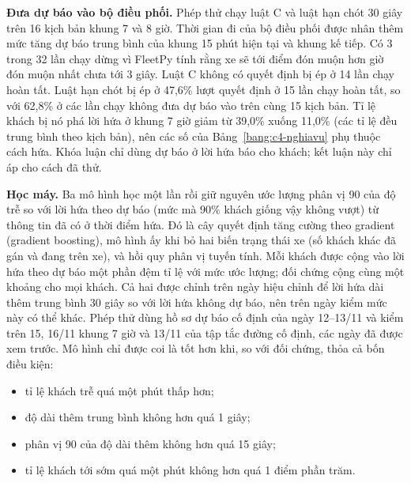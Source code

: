\textbf{Đưa dự báo vào bộ điều phối.} Phép thử chạy luật C và luật hạn chót 30 giây trên 16 kịch bản khung 7 và 8 giờ.
Thời gian đi của bộ điều phối được nhân thêm mức tăng dự báo trung bình của khung 15 phút hiện tại và khung kế tiếp. Có
3 trong 32 lần chạy dừng vì FleetPy tính rằng xe sẽ tới điểm đón muộn hơn giờ đón muộn nhất chưa tới 3 giây. Luật C
không có quyết định bị ép ở 14 lần chạy hoàn tất. Luật hạn chót bị ép ở 47,6\% lượt quyết định ở 15 lần chạy hoàn tất,
so với 62,8\% ở các lần chạy không đưa dự báo vào trên cùng 15 kịch bản. Tỉ lệ khách bị nó phá lời hứa ở khung 7 giờ giảm từ 39,0\% xuống 11,0\% (các
tỉ lệ đều trung bình theo kịch bản), nên các số của Bảng~\ref{bang:c4-nghiavu} phụ thuộc cách hứa. Khóa luận chỉ dùng
dự báo ở lời hứa báo cho khách; kết luận này chỉ áp cho cách đã thử.

\textbf{Học máy.} Ba mô hình học một lần rồi giữ nguyên ước lượng phân vị 90 của độ trễ so với lời hứa theo dự báo (mức
mà 90\% khách giống vậy không vượt) từ thông tin đã có ở thời điểm hứa. Đó là cây quyết định tăng cường theo gradient
(gradient boosting), mô hình ấy khi bỏ hai biến trạng thái xe (số khách khác đã gán và đang trên xe), và hồi quy phân vị
tuyến tính. Mỗi khách được cộng vào lời hứa theo dự báo một phần đệm tỉ lệ với mức ước lượng; đối chứng cộng cùng một
khoảng cho mọi khách. Cả hai được chỉnh trên ngày hiệu chỉnh để lời hứa dài thêm trung bình 30 giây so với lời hứa không
dự báo, nên trên ngày kiểm mức này có thể khác. Phép thử dùng hồ sơ dự báo cố định của ngày
12--13/11 và kiểm trên 15, 16/11 khung 7 giờ và 13/11 của tập tắc đường cố định, các ngày đã được xem trước. Mô hình
chỉ được coi là tốt hơn khi, so với đối chứng, thỏa cả bốn điều kiện:
\begin{itemize}[leftmargin=1.2cm,itemsep=0pt,topsep=2pt]
\item tỉ lệ khách trễ quá một phút thấp hơn;
\item độ dài thêm trung bình không hơn quá 1 giây;
\item phân vị 90 của độ dài thêm không hơn quá 15 giây;
\item tỉ lệ khách tới sớm quá một phút không hơn quá 1 điểm phần trăm.
\end{itemize}

